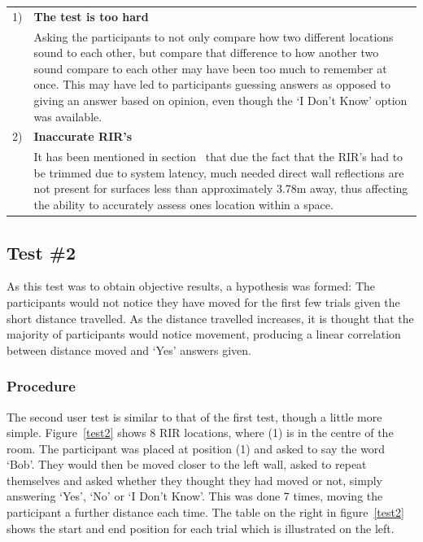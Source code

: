 \documentclass[../../main.tex]{subfiles}
\begin{document}
			\begin{tabular}{l p{} }
			1) & \textbf{The test is too hard} \\
			& Asking the participants to not only compare how two different locations sound to each other, but compare that difference to how another two sound compare to each other may have been too much to remember at once. This may have led to participants guessing answers as opposed to giving an answer based on opinion, even though the `I Don't Know' option was available. \\
			2) & \textbf{Inaccurate \ac{RIR}'s} \\
			& It has been mentioned in section~\nameref{RIRtrimming} that due the fact that the \ac{RIR}'s had to be trimmed due to system latency, much needed direct wall reflections are not present for surfaces less than approximately 3.78m away, thus affecting the ability to accurately assess ones location within a space.
			\end{tabular}

		\subsection{Test \#2}
			As this test was to obtain objective results, a hypothesis was formed: The participants would not notice they have moved for the first few trials given the short distance travelled. As the distance travelled increases, it is thought that the majority of participants would notice movement, producing a linear correlation between distance moved and `Yes' answers given.

			\subsubsection{Procedure}
				The second user test is similar to that of the first test, though a little more simple. Figure~\ref{test2} shows 8 \ac{RIR} locations, where (1) is in the centre of the room. The participant was placed at position (1) and asked to say the word `Bob'. They would then be moved closer to the left wall, asked to repeat themselves and asked whether they thought they had moved or not, simply answering `Yes', `No' or `I Don't Know'. This was done 7 times, moving the participant a further distance each time. The table on the right in figure~\ref{test2} shows the start and end position for each trial which is illustrated on the left.
\end{document}
